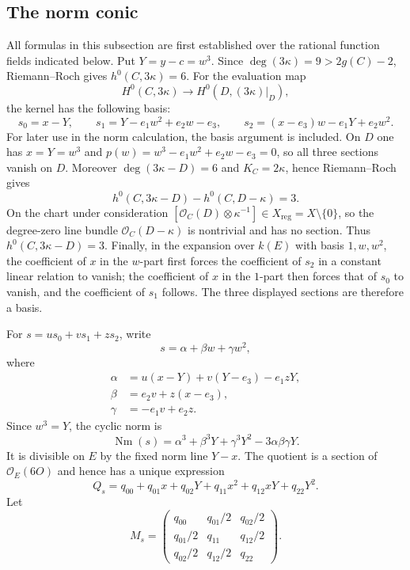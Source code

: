 \documentclass[10pt]{amsart}
\numberwithin{equation}{section}
\theoremstyle{definition}
\theoremstyle{remark}
\newcommand{\Nm}{\operatorname{Nm}}
\begin{document}
\subsection{The norm conic}

All formulas in this subsection are first established over the rational
function fields indicated below.  Put $Y=y-c=w^3$.  Since
$\deg(3\kappa)=9>2g(C)-2$, Riemann--Roch gives
$h^0(C,3\kappa)=6$.  For the evaluation map
\[
 H^0(C,3\kappa)\longrightarrow H^0(D,(3\kappa)|_D),
\]
the kernel has the following basis:
\[
 s_0=x-Y,
 \qquad
 s_1=Y-e_1w^2+e_2w-e_3,
 \qquad
 s_2=(x-e_3)w-e_1Y+e_2w^2.
\]
For later use in the norm calculation, the basis argument is included.  On $D$ one has $x=Y=w^3$ and
$p(w)=w^3-e_1w^2+e_2w-e_3=0$, so all three sections vanish on $D$.  Moreover
$\deg(3\kappa-D)=6$ and $K_C=2\kappa$, hence Riemann--Roch gives
\[
 h^0(C,3\kappa-D)-h^0(C,D-\kappa)=3.
\]
On the chart under consideration
$[\mathcal O_C(D)\otimes\kappa^{-1}]\in X_{\mathrm{reg}}=X\setminus\{0\}$,
so the degree-zero line bundle $\mathcal O_C(D-\kappa)$ is nontrivial and
has no section.  Thus $h^0(C,3\kappa-D)=3$.  Finally, in the expansion over
$k(E)$ with basis $1,w,w^2$, the coefficient of $x$ in the $w$-part first
forces the coefficient of $s_2$ in a constant linear relation to vanish;
the coefficient of $x$ in the $1$-part then forces that of $s_0$ to vanish,
and the coefficient of $s_1$ follows.  The three displayed sections are
therefore a basis.

For $s=us_0+vs_1+zs_2$, write
\[
 s=\alpha+\beta w+\gamma w^2,
\]
where
\[
 \begin{aligned}
 \alpha&=u(x-Y)+v(Y-e_3)-e_1zY,\\
 \beta&=e_2v+z(x-e_3),\\
 \gamma&=-e_1v+e_2z.
 \end{aligned}
\]
Since $w^3=Y$, the cyclic norm is
\begin{equation}
 \Nm(s)=\alpha^3+\beta^3Y+\gamma^3Y^2-3\alpha\beta\gamma Y.
\label{eq:cyclic-norm}
\end{equation}
It is divisible on $E$ by the fixed norm line $Y-x$.  The quotient is a
section of $\mathcal O_E(6O)$ and hence has a unique expression
\[
 Q_s=q_{00}+q_{01}x+q_{02}Y+q_{11}x^2+q_{12}xY+q_{22}Y^2.
\]
Let
\[
 M_s=
 \begin{pmatrix}
 q_{00}&q_{01}/2&q_{02}/2\\
 q_{01}/2&q_{11}&q_{12}/2\\
 q_{02}/2&q_{12}/2&q_{22}
 \end{pmatrix}.
\]
\end{document}
